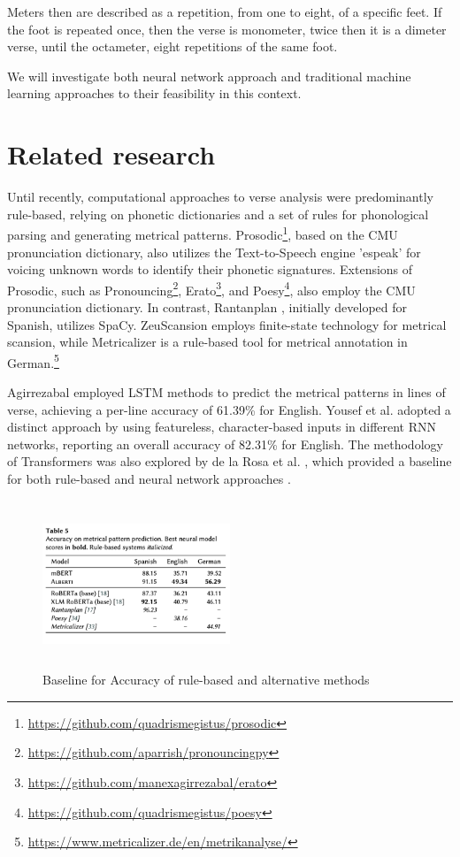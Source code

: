 \documentclass{article}
\begin{document}
Meters then are  described as a repetition, from one to eight, of a specific feet. If the foot is repeated once, then the verse is monometer, twice then it is a dimeter verse, until the octameter, eight repetitions of the same foot.

We will investigate both neural network approach and traditional machine learning approaches to their feasibility in this context.




 


\section{Related research}
\label{sec:headings}

Until recently, computational approaches to verse analysis were predominantly rule-based, relying on phonetic dictionaries and a set of rules for phonological parsing and generating metrical patterns. Prosodic\footnote{\url{https://github.com/quadrismegistus/prosodic}}, based on the CMU pronunciation dictionary, also utilizes the Text-to-Speech engine 'espeak' for voicing unknown words to identify their phonetic signatures. Extensions of Prosodic, such as Pronouncing\footnote{\url{https://github.com/aparrish/pronouncingpy}}, Erato\footnote{\url{https://github.com/manexagirrezabal/erato}}, and Poesy\footnote{\url{https://github.com/quadrismegistus/poesy}}, also employ the CMU pronunciation dictionary. In contrast, Rantanplan \cite{Rosa2020RantanplanFA}, initially developed for Spanish, utilizes SpaCy. ZeuScansion \cite{agirrezabal-etal-2013-zeuscansion} employs finite-state technology for metrical scansion, while Metricalizer  is a rule-based tool for metrical annotation in German.\footnote{\url{https://www.metricalizer.de/en/metrikanalyse/}}

Agirrezabal \cite{AgirrezabalLTSM} employed LSTM methods to predict the metrical patterns in lines of verse, achieving a per-line accuracy of 61.39\% for English. Yousef et al.\cite{Yousef2019LearningMetersArabicEnglish-arxiv} adopted a distinct approach by using featureless, character-based inputs in different RNN networks, reporting an overall accuracy of 82.31\% for English. The methodology of Transformers was also explored by de la Rosa et al. \cite{Delarosa2021Transformers}, which provided a baseline for both rule-based and neural network approaches \cite{Alberti}.
\begin{figure}[h!]
 \centering
 \includegraphics[width=0.5\textwidth, height=5cm]{images/alberti.png}
 \caption{Baseline for Accuracy of rule-based and alternative methods}
\end{figure}
\end{document}
